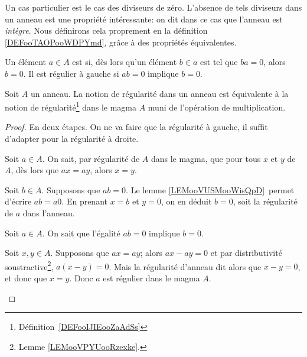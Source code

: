 \begin{normaltext}	\label{NORMooAnneauIntegreIntro}
	Un cas particulier est le cas des diviseurs de zéro. L'absence de tels diviseurs dans un anneau est une propriété intéressante: on dit dans ce cas que l'anneau est \emph{intègre}. Nous définirons cela proprement en la définition \ref{DEFooTAOPooWDPYmd}, grâce à des propriétés équivalentes.
\end{normaltext}

\begin{definition}\label{DEFooAnneauEltRegulier}
	Un élément \( a\in A\) est  si, dès lors qu'un élément \( b \in a \) est tel que \( ba=0\), alors \( b=0\). Il est régulier à gauche si \( ab=0\) implique \( b=0\).
\end{definition}

\begin{proposition}	\label{PROPooRegulierMagmaAnneau}
	Soit \( A \) un anneau. La notion de régularité dans un anneau est équivalente à la notion de régularité\footnote{Définition~\ref{DEFooIJIEooZaAdSs}} dans le magma \( A \) muni de l'opération de multiplication.
\end{proposition}

\begin{proof}
	En deux étapes. On ne va faire que la régularité à gauche, il suffit d'adapter pour la régularité à droite.
	\begin{subproof}
		Soit \( a \in A \). On sait, par régularité de \( A \) dans le magma, que pour tous \( x \) et \( y \) de \( A \), dès lors que \( ax = ay \), alors \( x = y \).

		Soit \( b \in A \). Supposons que \( ab = 0 \). Le lemme \ref{LEMooVUSMooWisQpD} permet d'écrire \( ab = a0 \). En prenant \( x = b \) et \( y = 0 \), on en déduit \( b = 0 \), soit la régularité de \( a \) dans l'anneau.

		Soit \( a \in A \). On sait que l'égalité \( ab=0\) implique \( b=0\).

		Soit \( x, y \in A \). Supposons que \( ax = ay \); alors \( ax - ay = 0 \) et par distributivité soustractive\footnote{Lemme \ref{LEMooVPYUooRzexke}.}, \( a(x-y) = 0\). Mais la régularité d'anneau dit alors que \( x - y = 0 \), et donc que \( x = y\). Donc \( a \) est régulier dans le magma \( A \).
	\end{subproof}
\end{proof}

